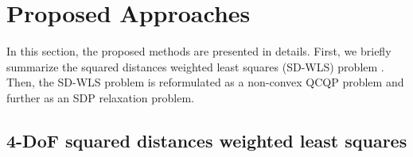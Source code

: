 \documentclass[journal]{IEEEtran}
\begin{document}
\section{Proposed Approaches} \label{sec:main_approaches}

In this section, the proposed methods are presented in details. First, we briefly summarize the squared distances weighted least squares (SD-WLS) problem \cite{trawny2010relplanar}. Then, the SD-WLS problem is reformulated as a non-convex QCQP problem and further as an SDP relaxation problem.

\subsection{4-DoF squared distances weighted least squares} \label{subsec:main_approaches_SD_WLS}
\end{document}
